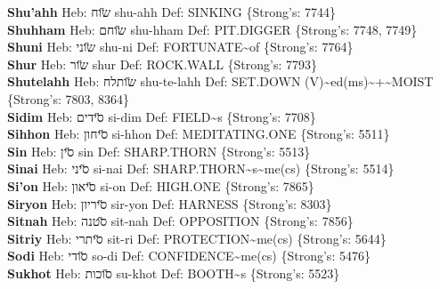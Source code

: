 {\textbf{Shu'ahh} Heb: {\large\H שוח} shu-ahh Def: SINKING \{Strong's: 7744\}\hfill{}\\

\textbf{Shuhham} Heb: {\large\H שוחם} shu-hham Def: PIT.DIGGER \{Strong's: 7748, 7749\}\hfill{}\\

\textbf{Shuni} Heb: {\large\H שוני} shu-ni Def: FORTUNATE\textasciitilde{}of \{Strong's: 7764\}\hfill{}\\

\textbf{Shur} Heb: {\large\H שור} shur Def: ROCK.WALL \{Strong's: 7793\}\hfill{}\\

\textbf{Shutelahh} Heb: {\large\H שותלח} shu-te-lahh Def: SET.DOWN (V)\textasciitilde{}ed(ms)\textasciitilde{}+\textasciitilde{}MOIST \{Strong's: 7803, 8364\}\hfill{}\\

\textbf{Sidim} Heb: {\large\H סידים} si-dim Def: FIELD\textasciitilde{}s \{Strong's: 7708\}\hfill{}\\

\textbf{Sihhon} Heb: {\large\H סיחון} si-hhon Def: MEDITATING.ONE \{Strong's: 5511\}\hfill{}\\

\textbf{Sin} Heb: {\large\H סין} sin Def: SHARP.THORN \{Strong's: 5513\}\hfill{}\\

\textbf{Sinai} Heb: {\large\H סיני} si-nai Def: SHARP.THORN\textasciitilde{}s\textasciitilde{}me(cs) \{Strong's: 5514\}\hfill{}\\

\textbf{Si'on} Heb: {\large\H סיאון} si-on Def: HIGH.ONE \{Strong's: 7865\}\hfill{}\\

\textbf{Siryon} Heb: {\large\H סיריון} sir-yon Def: HARNESS \{Strong's: 8303\}\hfill{}\\

\textbf{Sitnah} Heb: {\large\H סטנה} sit-nah Def: OPPOSITION \{Strong's: 7856\}\hfill{}\\

\textbf{Sitriy} Heb: {\large\H סיתרי} sit-ri Def: PROTECTION\textasciitilde{}me(cs) \{Strong's: 5644\}\hfill{}\\

\textbf{Sodi} Heb: {\large\H סודי} so-di Def: CONFIDENCE\textasciitilde{}me(cs) \{Strong's: 5476\}\hfill{}\\

\textbf{Sukhot} Heb: {\large\H סוכות} su-khot Def: BOOTH\textasciitilde{}s \{Strong's: 5523\}\hfill{}\\

}
